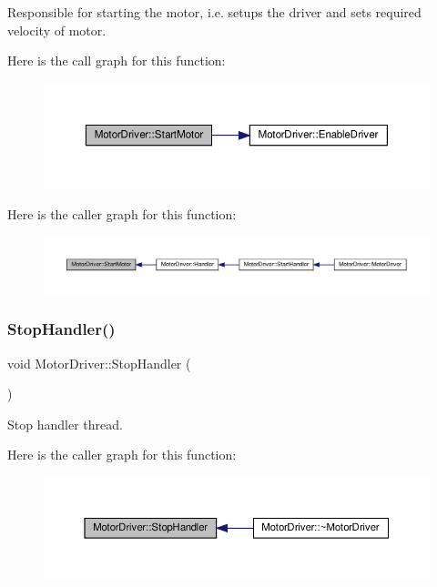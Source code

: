 Responsible for starting the motor, i.\+e. setups the driver and sets required velocity of motor. 

Here is the call graph for this function\+:
\nopagebreak
\begin{figure}[H]
\begin{center}
\leavevmode
\includegraphics[width=350pt]{classMotorDriver_a5ebab90ca98fa04463de1cbae76af994_cgraph}
\end{center}
\end{figure}
Here is the caller graph for this function\+:
\nopagebreak
\begin{figure}[H]
\begin{center}
\leavevmode
\includegraphics[width=350pt]{classMotorDriver_a5ebab90ca98fa04463de1cbae76af994_icgraph}
\end{center}
\end{figure}
\mbox{\label{classMotorDriver_a43c47b4f550a3ee08e7da340e699ba76}} 
\subsubsection{\texorpdfstring{Stop\+Handler()}{StopHandler()}}
{\footnotesize\ttfamily void Motor\+Driver\+::\+Stop\+Handler (\begin{DoxyParamCaption}{ }\end{DoxyParamCaption})}



Stop handler thread. 

Here is the caller graph for this function\+:
\nopagebreak
\begin{figure}[H]
\begin{center}
\leavevmode
\includegraphics[width=350pt]{classMotorDriver_a43c47b4f550a3ee08e7da340e699ba76_icgraph}
\end{center}
\end{figure}
\mbox{\label{classMotorDriver_aff8659e64841fb4b97c23b3494cd0575}} 
